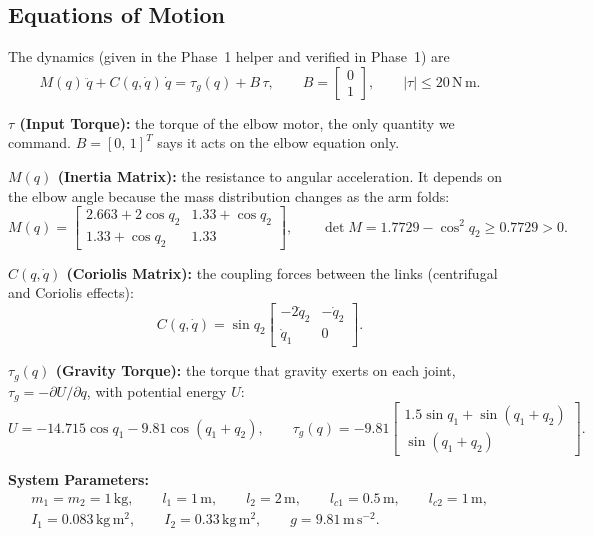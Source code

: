 \documentclass[12pt,a4paper]{article}
\newcommand{\Nm}{\,\mathrm{N\,m}}
\begin{document}
\subsection{Equations of Motion}
The dynamics (given in the Phase~1 helper and verified in Phase~1) are
\begin{equation}
M(q)\,\ddot q+C(q,\dot q)\,\dot q=\tau_g(q)+B\,\tau,\qquad B=\begin{bmatrix}0\\1\end{bmatrix},\qquad |\tau|\le 20\Nm .\label{eq:eom}
\end{equation}

\textbf{$\tau$ (Input Torque):} the torque of the elbow motor, the only quantity we command. $B=[0,\,1]^T$ says it acts on the elbow equation only.

\textbf{$M(q)$ (Inertia Matrix):} the resistance to angular acceleration. It depends on the elbow angle because the mass distribution changes as the arm folds:
\begin{equation}
M(q)=\begin{bmatrix}2.663+2\cos q_2 & 1.33+\cos q_2\\ 1.33+\cos q_2 & 1.33\end{bmatrix},\qquad \det M=1.7729-\cos^2q_2\ge0.7729>0 .
\end{equation}

\textbf{$C(q,\dot q)$ (Coriolis Matrix):} the coupling forces between the links (centrifugal and Coriolis effects):
\begin{equation}
C(q,\dot q)=\sin q_2\begin{bmatrix}-2\dot q_2 & -\dot q_2\\ \dot q_1 & 0\end{bmatrix}.
\end{equation}

\textbf{$\tau_g(q)$ (Gravity Torque):} the torque that gravity exerts on each joint, $\tau_g=-\partial U/\partial q$, with potential energy $U$:
\begin{equation}
U=-14.715\cos q_1-9.81\cos(q_1+q_2),\qquad
\tau_g(q)=-9.81\begin{bmatrix}1.5\sin q_1+\sin(q_1+q_2)\\ \sin(q_1+q_2)\end{bmatrix}.
\end{equation}

\textbf{System Parameters:}
\begin{gather*}
m_1=m_2=1\,\mathrm{kg},\qquad l_1=1\,\mathrm m,\qquad l_2=2\,\mathrm m,\qquad l_{c1}=0.5\,\mathrm m,\qquad l_{c2}=1\,\mathrm m,\\
I_1=0.083\,\mathrm{kg\,m^2},\qquad I_2=0.33\,\mathrm{kg\,m^2},\qquad g=9.81\,\mathrm{m\,s^{-2}}.
\end{gather*}
\end{document}
